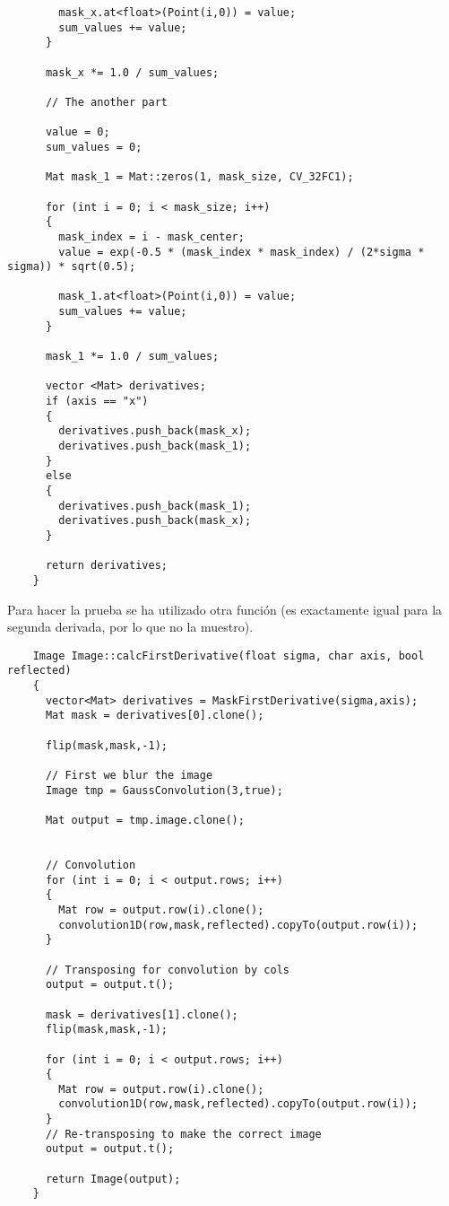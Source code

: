 \documentclass[a4paper, 11pt]{article}
\theoremstyle{definition}
\begin{document}
\begin{lstlisting}
        mask_x.at<float>(Point(i,0)) = value;
        sum_values += value;
      }

      mask_x *= 1.0 / sum_values;

      // The another part

      value = 0;
      sum_values = 0;

      Mat mask_1 = Mat::zeros(1, mask_size, CV_32FC1);

      for (int i = 0; i < mask_size; i++)
      {
        mask_index = i - mask_center;
        value = exp(-0.5 * (mask_index * mask_index) / (2*sigma * sigma)) * sqrt(0.5);

        mask_1.at<float>(Point(i,0)) = value;
        sum_values += value;
      }

      mask_1 *= 1.0 / sum_values;

      vector <Mat> derivatives;
      if (axis == "x")
      {
        derivatives.push_back(mask_x);
        derivatives.push_back(mask_1);
      }
      else
      {
        derivatives.push_back(mask_1);
        derivatives.push_back(mask_x);
      }

      return derivatives;
    }
  \end{lstlisting}

  Para hacer la prueba se ha utilizado otra función (es exactamente igual para la segunda
  derivada, por lo que no la muestro).

  \begin{lstlisting}
    Image Image::calcFirstDerivative(float sigma, char axis, bool reflected)
    {
      vector<Mat> derivatives = MaskFirstDerivative(sigma,axis);
      Mat mask = derivatives[0].clone();

      flip(mask,mask,-1);

      // First we blur the image
      Image tmp = GaussConvolution(3,true);

      Mat output = tmp.image.clone();


      // Convolution
      for (int i = 0; i < output.rows; i++)
      {
        Mat row = output.row(i).clone();
        convolution1D(row,mask,reflected).copyTo(output.row(i));
      }

      // Transposing for convolution by cols
      output = output.t();

      mask = derivatives[1].clone();
      flip(mask,mask,-1);

      for (int i = 0; i < output.rows; i++)
      {
        Mat row = output.row(i).clone();
        convolution1D(row,mask,reflected).copyTo(output.row(i));
      }
      // Re-transposing to make the correct image
      output = output.t();

      return Image(output);
    }
  \end{lstlisting}
\end{document}
